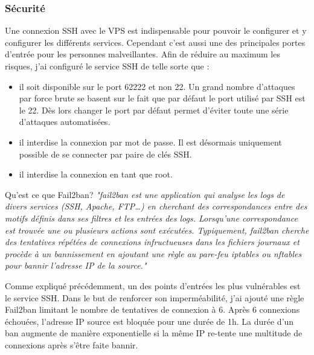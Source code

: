 \subsubsection{Sécurité}
\newparasm
Une connexion SSH avec le VPS est indispensable pour pouvoir le configurer et y configurer les différents services. Cependant c'est aussi une des principales portes d'entrée pour les personnes malveillantes. Afin de réduire au maximum les risques, j'ai configuré le service SSH de telle sorte que :
\begin{itemize}
  \item il soit disponible sur le port 62222 et non 22. Un grand nombre d'attaques par force brute se basent sur le fait que par défaut le port utilisé par SSH est le 22. Dès lors changer le port par défaut permet d'éviter toute une série d'attaques automatisées. 
  \item il interdise la connexion par mot de passe. Il est désormais uniquement possible de se connecter par paire de clés SSH.
  \item il interdise la connexion en tant que root. 
\end{itemize} 

\newparasm
Qu'est ce que Fail2ban? \textit{"fail2ban est une application qui analyse les logs de divers services (SSH, Apache, FTP…) en cherchant des correspondances entre des motifs définis dans ses filtres et les entrées des logs. Lorsqu'une correspondance est trouvée une ou plusieurs actions sont exécutées. Typiquement, fail2ban cherche des tentatives répétées de connexions infructueuses dans les fichiers journaux et procède à un bannissement en ajoutant une règle au pare-feu iptables ou nftables pour bannir l'adresse IP de la source."}\cite{F2B}

\newpara

Comme expliqué précédemment, un des points d'entrées les plus vulnérables est le service SSH. Dans le but de renforcer son imperméabilité, j'ai ajouté une règle Fail2ban limitant le nombre de tentatives de connexion à 6. Après 6 connexions échouées, l'adresse IP source est bloquée pour une durée de 1h. La durée d'un ban augmente de manière exponentielle si la même IP re-tente une multitude de connexions après s'être faite bannir. 

\newpage

